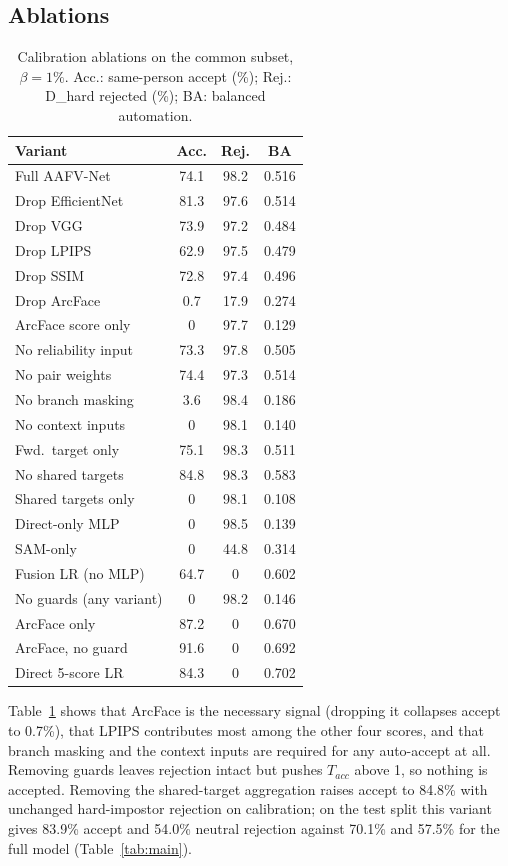 \documentclass[10pt, a4paper, twocolumn]{article}
\newcommand{\sys}{AAFV-Net}
\begin{document}
\subsection{Ablations}
\begin{table}[h]
\centering\small
\caption{Calibration ablations on the common subset, $\beta=1\%$. Acc.: same-person accept (\%); Rej.: D\_hard rejected (\%); BA: balanced automation.}
\label{tab:abl}
\setlength{\tabcolsep}{3pt}
\begin{tabular}{@{}lccc@{}}
\toprule
Variant & Acc. & Rej. & BA\\\midrule
Full \sys & 74.1 & 98.2 & 0.516\\
Drop EfficientNet & 81.3 & 97.6 & 0.514\\
Drop VGG & 73.9 & 97.2 & 0.484\\
Drop LPIPS & 62.9 & 97.5 & 0.479\\
Drop SSIM & 72.8 & 97.4 & 0.496\\
Drop ArcFace & 0.7 & 17.9 & 0.274\\
ArcFace score only & 0 & 97.7 & 0.129\\
No reliability input & 73.3 & 97.8 & 0.505\\
No pair weights & 74.4 & 97.3 & 0.514\\
No branch masking & 3.6 & 98.4 & 0.186\\
No context inputs & 0 & 98.1 & 0.140\\
Fwd.\ target only & 75.1 & 98.3 & 0.511\\
No shared targets & 84.8 & 98.3 & 0.583\\
Shared targets only & 0 & 98.1 & 0.108\\
Direct-only MLP & 0 & 98.5 & 0.139\\
SAM-only & 0 & 44.8 & 0.314\\
Fusion LR (no MLP) & 64.7 & 0 & 0.602\\
No guards (any variant) & 0 & 98.2 & 0.146\\
ArcFace only & 87.2 & 0 & 0.670\\
ArcFace, no guard & 91.6 & 0 & 0.692\\
Direct 5-score LR & 84.3 & 0 & 0.702\\\bottomrule
\end{tabular}
\end{table}
Table~\ref{tab:abl} shows that ArcFace is the necessary signal (dropping it collapses accept to 0.7\%), that LPIPS contributes most among the other four scores, and that branch masking and the context inputs are required for any auto-accept at all. Removing guards leaves rejection intact but pushes $T_{acc}$ above 1, so nothing is accepted. Removing the shared-target aggregation raises accept to 84.8\% with unchanged hard-impostor rejection on calibration; on the test split this variant gives 83.9\% accept and 54.0\% neutral rejection against 70.1\% and 57.5\% for the full model (Table~\ref{tab:main}).
\end{document}
